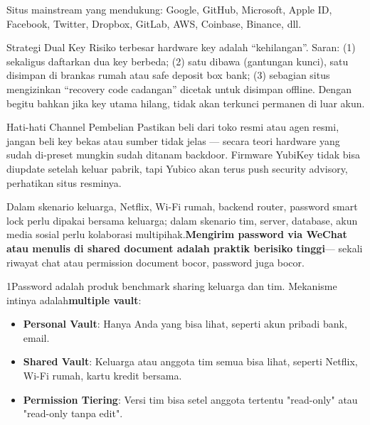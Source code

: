 Situs mainstream yang mendukung: Google, GitHub, Microsoft, Apple ID, Facebook, Twitter, Dropbox, GitLab, AWS, Coinbase, Binance, dll.

\begin{tcbinfo}{Strategi Dual Key}
Risiko terbesar hardware key adalah “kehilangan”. Saran: (1) sekaligus daftarkan dua key berbeda; (2) satu dibawa (gantungan kunci), satu disimpan di brankas rumah atau safe deposit box bank; (3) sebagian situs mengizinkan “recovery code cadangan” dicetak untuk disimpan offline. Dengan begitu bahkan jika key utama hilang, tidak akan terkunci permanen di luar akun.

\end{tcbinfo}

\begin{tcbwarn}{Hati-hati Channel Pembelian}
Pastikan beli dari toko resmi atau agen resmi, jangan beli key bekas atau sumber tidak jelas — secara teori hardware yang sudah di-preset mungkin sudah ditanam backdoor. Firmware YubiKey tidak bisa diupdate setelah keluar pabrik, tapi Yubico akan terus push security advisory, perhatikan situs resminya.

\end{tcbwarn}


Dalam skenario keluarga, Netflix, Wi-Fi rumah, backend router, password smart lock perlu dipakai bersama keluarga; dalam skenario tim, server, database, akun media sosial perlu kolaborasi multipihak.\textbf{Mengirim password via WeChat atau menulis di shared document adalah praktik berisiko tinggi}— sekali riwayat chat atau permission document bocor, password juga bocor.


1Password adalah produk benchmark sharing keluarga dan tim. Mekanisme intinya adalah\textbf{multiple vault}:

\begin{itemize}
  \item \textbf{Personal Vault}: Hanya Anda yang bisa lihat, seperti akun pribadi bank, email.
  \item \textbf{Shared Vault}: Keluarga atau anggota tim semua bisa lihat, seperti Netflix, Wi-Fi rumah, kartu kredit bersama.
  \item \textbf{Permission Tiering}: Versi tim bisa setel anggota tertentu "read-only" atau "read-only tanpa edit".
\end{itemize}

